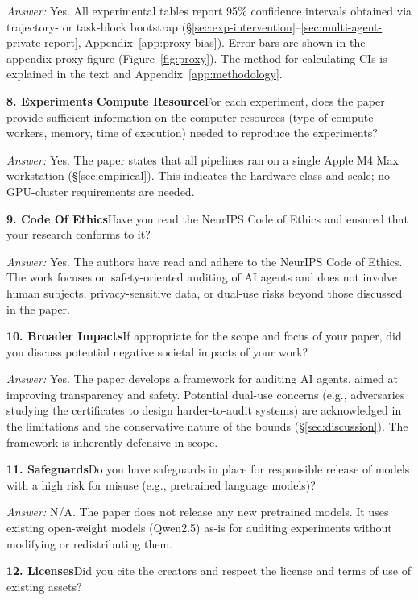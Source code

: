\documentclass{article}
\begin{document}
\emph{Answer:} Yes. All experimental tables report 95\% confidence intervals obtained via trajectory- or task-block bootstrap (\S\ref{sec:exp-intervention}--\ref{sec:multi-agent-private-report}, Appendix~\ref{app:proxy-bias}). Error bars are shown in the appendix proxy figure (Figure~\ref{fig:proxy}). The method for calculating CIs is explained in the text and Appendix~\ref{app:methodology}.

\noindent\textbf{8. Experiments Compute Resource}\quad For each experiment, does the paper provide sufficient information on the computer resources (type of compute workers, memory, time of execution) needed to reproduce the experiments?

\emph{Answer:} Yes. The paper states that all pipelines ran on a single Apple M4 Max workstation (\S\ref{sec:empirical}). This indicates the hardware class and scale; no GPU-cluster requirements are needed.

\noindent\textbf{9. Code Of Ethics}\quad Have you read the NeurIPS Code of Ethics and ensured that your research conforms to it?

\emph{Answer:} Yes. The authors have read and adhere to the NeurIPS Code of Ethics. The work focuses on safety-oriented auditing of AI agents and does not involve human subjects, privacy-sensitive data, or dual-use risks beyond those discussed in the paper.

\noindent\textbf{10. Broader Impacts}\quad If appropriate for the scope and focus of your paper, did you discuss potential negative societal impacts of your work?

\emph{Answer:} Yes. The paper develops a framework for auditing AI agents, aimed at improving transparency and safety. Potential dual-use concerns (e.g., adversaries studying the certificates to design harder-to-audit systems) are acknowledged in the limitations and the conservative nature of the bounds (\S\ref{sec:discussion}). The framework is inherently defensive in scope.

\noindent\textbf{11. Safeguards}\quad Do you have safeguards in place for responsible release of models with a high risk for misuse (e.g., pretrained language models)?

\emph{Answer:} N/A. The paper does not release any new pretrained models. It uses existing open-weight models (Qwen2.5) as-is for auditing experiments without modifying or redistributing them.

\noindent\textbf{12. Licenses}\quad Did you cite the creators and respect the license and terms of use of existing assets?
\end{document}
